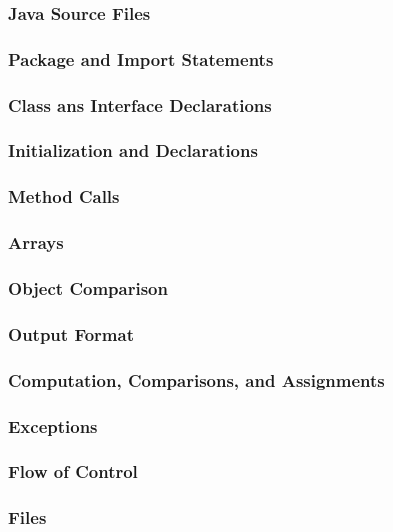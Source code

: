 \documentclass{article}
\begin{document}
 \subsubsection{Java Source Files}
 \subsubsection{Package and Import Statements}
 \subsubsection{Class ans Interface Declarations}
 \subsubsection{Initialization and Declarations}
 \subsubsection{Method Calls}
 \subsubsection{Arrays}
 \subsubsection{Object Comparison}
 \subsubsection{Output Format}
 \subsubsection{Computation, Comparisons, and Assignments}
 \subsubsection{Exceptions}
 \subsubsection{Flow of Control}
 \subsubsection{Files}
\end{document}
